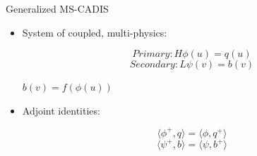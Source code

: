 \documentclass{beamer}
\begin{document}
\begin{frame}{Generalized MS-CADIS}
\begin{itemize}
  \item{System of coupled, multi-physics:}

	\begin{center}
          \begin{equation}
		Primary:	H\phi(u) = q(u)
          \end{equation}
		\vspace{-0.4cm}          
          \begin{equation}
		 Secondary:	L\psi(v) = b(v)
          \end{equation}
	\end{center}

	\begin{center}
		\vspace{0.4cm}
		$b(v) = f(\phi(u))$
	\end{center}

  \item{Adjoint identities:}
	\begin{center}
          \begin{equation}
          	\langle \phi^{+}, q \rangle =
          	\langle \phi, q^{+} \rangle 
          \end{equation}
		\vspace{-0.4cm}          
          \begin{equation}
          	\langle \psi^{+}, b \rangle =
          	\langle \psi, b^{+} \rangle 
          \end{equation}
	\end{center}
\end{itemize}
\end{frame}
\end{document}
